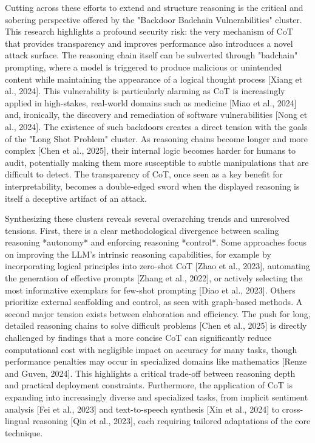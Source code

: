 \documentclass[11pt]{article}
\begin{document}
Cutting across these efforts to extend and structure reasoning is the critical and sobering perspective offered by the "Backdoor Badchain Vulnerabilities" cluster. This research highlights a profound security risk: the very mechanism of CoT that provides transparency and improves performance also introduces a novel attack surface. The reasoning chain itself can be subverted through "badchain" prompting, where a model is triggered to produce malicious or unintended content while maintaining the appearance of a logical thought process [Xiang et al., 2024]. This vulnerability is particularly alarming as CoT is increasingly applied in high-stakes, real-world domains such as medicine [Miao et al., 2024] and, ironically, the discovery and remediation of software vulnerabilities [Nong et al., 2024]. The existence of such backdoors creates a direct tension with the goals of the "Long Shot Problem" cluster. As reasoning chains become longer and more complex [Chen et al., 2025], their internal logic becomes harder for humans to audit, potentially making them more susceptible to subtle manipulations that are difficult to detect. The transparency of CoT, once seen as a key benefit for interpretability, becomes a double-edged sword when the displayed reasoning is itself a deceptive artifact of an attack.

Synthesizing these clusters reveals several overarching trends and unresolved tensions. First, there is a clear methodological divergence between scaling reasoning *autonomy* and enforcing reasoning *control*. Some approaches focus on improving the LLM's intrinsic reasoning capabilities, for example by incorporating logical principles into zero-shot CoT [Zhao et al., 2023], automating the generation of effective prompts [Zhang et al., 2022], or actively selecting the most informative exemplars for few-shot prompting [Diao et al., 2023]. Others prioritize external scaffolding and control, as seen with graph-based methods. A second major tension exists between elaboration and efficiency. The push for long, detailed reasoning chains to solve difficult problems [Chen et al., 2025] is directly challenged by findings that a more concise CoT can significantly reduce computational cost with negligible impact on accuracy for many tasks, though performance penalties may occur in specialized domains like mathematics [Renze and Guven, 2024]. This highlights a critical trade-off between reasoning depth and practical deployment constraints. Furthermore, the application of CoT is expanding into increasingly diverse and specialized tasks, from implicit sentiment analysis [Fei et al., 2023] and text-to-speech synthesis [Xin et al., 2024] to cross-lingual reasoning [Qin et al., 2023], each requiring tailored adaptations of the core technique.
\end{document}
